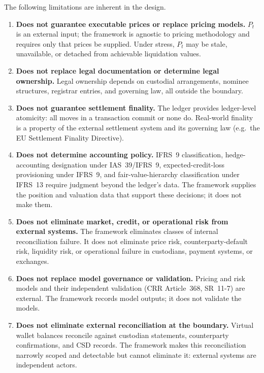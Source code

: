 \documentclass[11pt,a4paper]{article}
\begin{document}
The following limitations are inherent in the design.

\begin{enumerate}
\item \textbf{Does not guarantee executable prices or replace pricing models.} $P_t$ is an external input; the framework is agnostic to pricing methodology and requires only that prices be supplied. Under stress, $P_t$ may be stale, unavailable, or detached from achievable liquidation values.

\item \textbf{Does not replace legal documentation or determine legal ownership.} Legal ownership depends on custodial arrangements, nominee structures, registrar entries, and governing law, all outside the boundary.

\item \textbf{Does not guarantee settlement finality.} The ledger provides ledger-level atomicity: all moves in a transaction commit or none do. Real-world finality is a property of the external settlement system and its governing law (e.g.\ the EU Settlement Finality Directive).

\item \textbf{Does not determine accounting policy.} IFRS~9 classification, hedge-accounting designation under IAS~39/IFRS~9, expected-credit-loss provisioning under IFRS~9, and fair-value-hierarchy classification under IFRS~13 require judgment beyond the ledger's data. The framework supplies the position and valuation data that support these decisions; it does not make them.

\item \textbf{Does not eliminate market, credit, or operational risk from external systems.} The framework eliminates classes of internal reconciliation failure. It does not eliminate price risk, counterparty-default risk, liquidity risk, or operational failure in custodians, payment systems, or exchanges.

\item \textbf{Does not replace model governance or validation.} Pricing and risk models and their independent validation (CRR Article~368, SR~11-7) are external. The framework records model outputs; it does not validate the models.

\item \textbf{Does not eliminate external reconciliation at the boundary.} Virtual wallet balances reconcile against custodian statements, counterparty confirmations, and CSD records. The framework makes this reconciliation narrowly scoped and detectable but cannot eliminate it: external systems are independent actors.


\end{enumerate}
\end{document}
